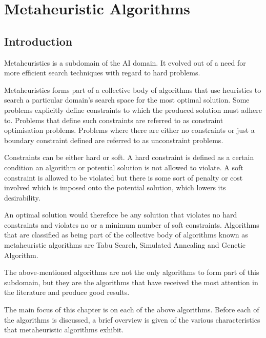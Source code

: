 \chapter{Metaheuristic Algorithms}
\label{chpt:heuristic}
\section{Introduction}
Metaheuristics is a subdomain of the \gls{AI} domain\cite{AIModernApproach}. It evolved out of a need for more efficient search techniques with regard to hard problems. 

Metaheuristics forms part of a collective body of algorithms that use heuristics to search a particular domain's search space for the most optimal solution\cite{AIModernApproach,NatureInspiredMetaHeuristic}. Some problems explicitly define constraints to which the produced solution must adhere to. Problems that define such constraints are referred to as constraint optimisation problems\cite{FundamentalSwarm}. Problems where there are either no constraints or just a boundary constraint  defined are referred to as unconstraint problems\cite{FundamentalSwarm}.

Constraints can be either hard or soft. A hard constraint is defined as a certain condition an algorithm or potential solution is not allowed to violate\cite{AIModernApproach,NatureInspiredMetaHeuristic,Karen2004,Eisenblatter}. A soft constraint is allowed to be violated but there is some sort of penalty or cost involved which is imposed onto the potential solution, which lowers its desirability\cite{AIModernApproach,NatureInspiredMetaHeuristic,Karen2004,Eisenblatter}. 

An optimal solution would therefore be any solution that violates no hard constraints and violates no or a minimum number of soft constraints\cite{AIModernApproach,NatureInspiredMetaHeuristic,Karen2004,Eisenblatter}. Algorithms that are classified as being part of the collective body of algorithms known as metaheuristic algorithms are Tabu Search\cite{TabuVechicleRoutingWithTimeWindows,TabuCSP}, Simulated Annealing \cite{SASingleMultiObj,CurveFittingSA} and Genetic Algorithm\cite{GATSP, GeostatisticalGA}.

The above-mentioned algorithms are not the only algorithms to form part of this subdomain, but they are the algorithms that have received the most attention in the literature and produce good results\cite{SweepMeta}.

The main focus of this chapter is on each of the above algorithms. Before each of the algorithms is discussed, a brief overview is given of the various characteristics that metaheuristic algorithms exhibit. 

